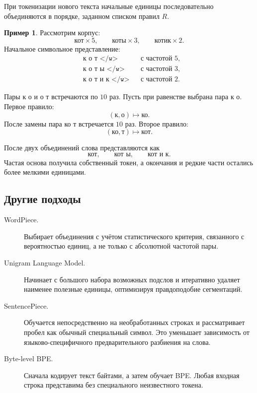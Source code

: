 \documentclass[12pt,a4paper]{article}
\newcommand{\1}{\mathbf{1}}
\theoremstyle{definition}
\newtheorem{example}[theorem]{Пример}
\theoremstyle{remark}
\begin{document}
При токенизации нового текста начальные единицы последовательно
объединяются в порядке, заданном списком правил $R$.

\begin{example}
Рассмотрим корпус:
\[
\texttt{кот}\times 5,\qquad
\texttt{коты}\times 3,\qquad
\texttt{котик}\times 2.
\]
Начальное символьное представление:
\[
\begin{aligned}
&\texttt{к о т </w>} &&\text{с частотой }5,\\
&\texttt{к о т ы </w>} &&\text{с частотой }3,\\
&\texttt{к о т и к </w>} &&\text{с частотой }2.
\end{aligned}
\]

Пары $\texttt{к о}$ и $\texttt{о т}$ встречаются по $10$ раз.
Пусть при равенстве выбрана пара $\texttt{к о}$. Первое правило:
\[
(\texttt{к},\texttt{о})\mapsto\texttt{ко}.
\]
После замены пара $\texttt{ко т}$ встречается $10$ раз. Второе правило:
\[
(\texttt{ко},\texttt{т})\mapsto\texttt{кот}.
\]

После двух объединений слова представляются как
\[
\texttt{кот},\qquad
\texttt{кот ы},\qquad
\texttt{кот и к}.
\]
Частая основа получила собственный токен, а окончания и редкие части
остались более мелкими единицами.
\end{example}

\subsection{Другие подходы}

\begin{description}
    \item[WordPiece.] Выбирает объединения с учётом статистического
    критерия, связанного с вероятностью единиц, а не только с абсолютной
    частотой пары.

    \item[Unigram Language Model.] Начинает с большого набора возможных
    подслов и итеративно удаляет наименее полезные единицы, оптимизируя
    правдоподобие сегментаций.

    \item[SentencePiece.] Обучается непосредственно на необработанных
    строках и рассматривает пробел как обычный специальный символ.
    Это уменьшает зависимость от языково-специфичного предварительного
    разбиения на слова.

    \item[Byte-level BPE.] Сначала кодирует текст байтами, а затем обучает
    BPE. Любая входная строка представима без специального неизвестного
    токена.
\end{description}
\end{document}

